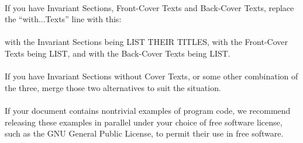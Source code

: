 \documentclass[11pt,a5paper,twoside]{book}
\begin{document}
\begin{english}
\paragraph{} If you have Invariant Sections, Front-Cover Texts and Back-Cover Texts,
replace the “with...Texts” line with this:\\\\
{
\ttfamily with the Invariant Sections being LIST THEIR TITLES, with the
    Front-Cover Texts being LIST, and with the Back-Cover Texts being LIST.
}
\paragraph{} If you have Invariant Sections without Cover Texts, or some other
combination of the three, merge those two alternatives to suit the
situation.
\paragraph{} If your document contains nontrivial examples of program code, we
recommend releasing these examples in parallel under your choice of
free software license, such as the GNU General Public License,
to permit their use in free software.
\end{english}
\end{document}
